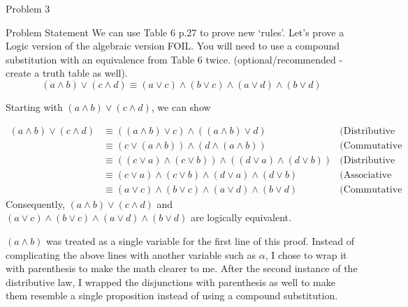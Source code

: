 \begin{problem}{Problem 3}
    \begin{statement}{Problem Statement}
        We can use Table 6 p.27 to prove new `rules'. Let’s prove a Logic version of the algebraic version FOIL. You will need to use a compound substitution with an equivalence from Table 6 twice. 
        (optional/recommended - create a truth table as well).
        \begin{equation*}
            (a \wedge b) \vee (c \wedge d) \equiv (a \vee c) \wedge (b \vee c) \wedge (a \vee d) \wedge (b \vee d)
        \end{equation*}
    \end{statement}

    \begin{Highlight}[Solution]
        Starting with $(a \wedge b) \vee (c \wedge d)$, we can show

        \begin{align*}
            (a \wedge b) \vee (c \wedge d) & \equiv ((a \wedge b) \vee c) \wedge ((a \wedge b) \vee d) & \text{(Distributive Laws)} \\
            & \equiv (c \vee (a \wedge b)) \wedge (d \wedge (a \wedge b)) & \text{(Commutative Laws)} \\
            & \equiv ((c \vee a) \wedge (c \vee b)) \wedge ((d \vee a) \wedge (d \vee b)) & \text{(Distributive Laws)} \\
            & \equiv (c \vee a) \wedge (c \vee b) \wedge (d \vee a) \wedge (d \vee b) & \text{(Associative Laws)} \\
            & \equiv (a \vee c) \wedge (b \vee c) \wedge (a \vee d) \wedge (b \vee d) & \text{(Commutative Laws)}
        \end{align*}
        Consequently, $(a \wedge b) \vee (c \wedge d)$ and $(a \vee c) \wedge (b \vee c) \wedge (a \vee d) \wedge (b \vee d)$ are logically equivalent.

        $(a \wedge b)$ was treated as a single variable for the first line of this proof. Instead of complicating the above lines with another variable such as $\alpha$, I chose to wrap it with parenthesis
        to make the math clearer to me. After the second instance of the distributive law, I wrapped the disjunctions with parenthesis as well to make them resemble a single proposition instead of using a
        compound substitution.
    \end{Highlight}
\end{problem}


